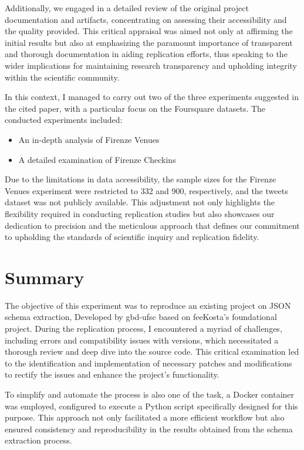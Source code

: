 \documentclass[sigconf, nonacm]{acmart}
\begin{document}
Additionally, we engaged in a detailed review of the original project documentation and artifacts, concentrating on assessing their accessibility and the quality provided. This critical appraisal was aimed not only at affirming the initial results but also at emphasizing the paramount importance of transparent and thorough documentation in aiding replication efforts, thus speaking to the wider implications for maintaining research transparency and upholding integrity within the scientific community.

 In this context, I managed to carry out two of the three experiments suggested in the cited paper\cite{8424731}, with a particular focus on the Foursquare datasets. The conducted experiments included:

 \begin{itemize}
     \item An in-depth analysis of Firenze Venues
     \item A detailed examination of Firenze Checkins
 \end{itemize}

Due to the limitations in data accessibility, the sample sizes for the Firenze Venues experiment were restricted to 332 and 900, respectively, and the tweets dataset  was not publicly available. This adjustment not only highlights the flexibility required in conducting replication studies but also showcases our dedication to precision and the meticulous approach that defines our commitment to upholding the standards of scientific inquiry and replication fidelity.\newpage



\section{\textbf{Summary}  }

The objective of this experiment was to reproduce an existing project on JSON schema extraction, Developed by gbd-ufsc based on feeKosta’s foundational project. During the replication process, I encountered a myriad of challenges, including errors and compatibility issues with versions, which necessitated a thorough review and deep dive into the source code. This critical examination led to the identification and implementation of necessary patches and modifications to rectify the issues and enhance the project's functionality.

To simplify and automate the process is also one of the task, a Docker container was employed, configured to execute a Python script specifically designed for this purpose. This approach not only facilitated a more efficient workflow but also ensured consistency and reproducibility in the results obtained from the schema extraction process.
\end{document}

